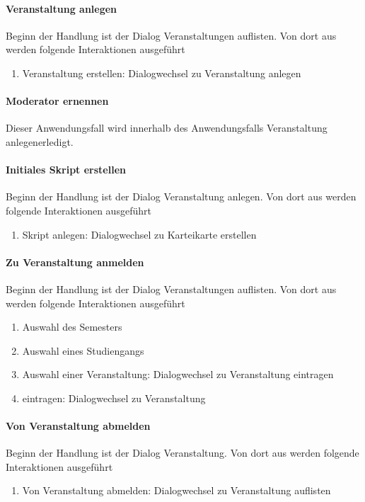 \documentclass[12pt,a4paper]{article}
\begin{document}
{\paragraph{Veranstaltung anlegen}
Beginn der Handlung ist der Dialog \glqq Veranstaltungen auflisten\grqq. Von dort aus werden folgende Interaktionen ausgeführt
\begin{enumerate}
\item \glqq Veranstaltung erstellen\grqq: Dialogwechsel zu \glqq Veranstaltung anlegen\grqq
\end{enumerate}

\paragraph{Moderator ernennen}
Dieser Anwendungsfall wird innerhalb des Anwendungsfalls \glqq Veranstaltung anlegen\grqq erledigt.

\paragraph{Initiales Skript erstellen}
Beginn der Handlung ist der Dialog \glqq Veranstaltung anlegen\grqq. Von dort aus werden folgende Interaktionen ausgeführt
\begin{enumerate}
\item \glqq Skript anlegen\grqq: Dialogwechsel zu \glqq Karteikarte erstellen\grqq
\end{enumerate}

\paragraph{Zu Veranstaltung anmelden}
Beginn der Handlung ist der Dialog \glqq Veranstaltungen auflisten\grqq. Von dort aus werden folgende Interaktionen ausgeführt
\begin{enumerate}
\item \glqq Auswahl des Semesters\grqq
\item \glqq Auswahl eines Studiengangs\grqq
\item \glqq Auswahl einer Veranstaltung\grqq: Dialogwechsel zu \glqq Veranstaltung eintragen\grqq
\item \glqq eintragen\grqq: Dialogwechsel zu \glqq Veranstaltung\grqq
\end{enumerate}

\paragraph{Von Veranstaltung abmelden}
Beginn der Handlung ist der Dialog \glqq Veranstaltung\grqq. Von dort aus werden folgende Interaktionen ausgeführt
\begin{enumerate}
\item \glqq Von Veranstaltung abmelden\grqq: Dialogwechsel zu \glqq Veranstaltung auflisten \grqq
\end{enumerate}

}
\end{document}
